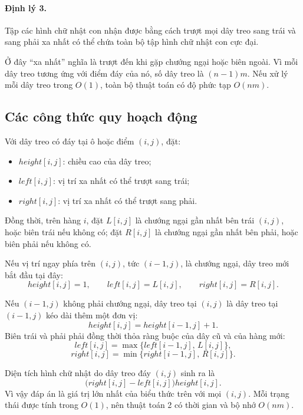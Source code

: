 \documentclass[11pt]{article}
\begin{document}
\paragraph{Định lý 3.}
Tập các hình chữ nhật con nhận được bằng cách trượt mọi dây treo sang trái và
sang phải xa nhất có thể chứa toàn bộ tập hình chữ nhật con cực đại.

Ở đây ``xa nhất'' nghĩa là trượt đến khi gặp chướng ngại hoặc biên ngoài.
Vì mỗi dây treo tương ứng với điểm đáy của nó, số dây treo là
\((n-1)m\). Nếu xử lý mỗi dây treo trong \(O(1)\), toàn bộ thuật toán có độ
phức tạp \(O(nm)\).

\subsection{Các công thức quy hoạch động}

Với dây treo có đáy tại ô hoặc điểm \((i,j)\), đặt:

\begin{itemize}
  \item \(\mathit{height}[i,j]\): chiều cao của dây treo;
  \item \(\mathit{left}[i,j]\): vị trí xa nhất có thể trượt sang trái;
  \item \(\mathit{right}[i,j]\): vị trí xa nhất có thể trượt sang phải.
\end{itemize}

Đồng thời, trên hàng \(i\), đặt \(L[i,j]\) là chướng ngại gần nhất bên trái
\((i,j)\), hoặc biên trái nếu không có; đặt \(R[i,j]\) là chướng ngại gần
nhất bên phải, hoặc biên phải nếu không có.

Nếu vị trí ngay phía trên \((i,j)\), tức \((i-1,j)\), là chướng ngại, dây
treo mới bắt đầu tại đây:
\[
  \mathit{height}[i,j]=1,\qquad
  \mathit{left}[i,j]=L[i,j],\qquad
  \mathit{right}[i,j]=R[i,j].
\]

Nếu \((i-1,j)\) không phải chướng ngại, dây treo tại \((i,j)\) là dây treo
tại \((i-1,j)\) kéo dài thêm một đơn vị:
\[
  \mathit{height}[i,j]=\mathit{height}[i-1,j]+1.
\]
Biên trái và phải phải đồng thời thỏa ràng buộc của dây cũ và của hàng mới:
\[
  \mathit{left}[i,j]=\max\{\mathit{left}[i-1,j],\,L[i,j]\},
\]
\[
  \mathit{right}[i,j]=\min\{\mathit{right}[i-1,j],\,R[i,j]\}.
\]

Diện tích hình chữ nhật do dây treo đáy \((i,j)\) sinh ra là
\[
  \bigl(\mathit{right}[i,j]-\mathit{left}[i,j]\bigr)
  \mathit{height}[i,j].
\]
Vì vậy đáp án là giá trị lớn nhất của biểu thức trên với mọi \((i,j)\). Mỗi
trạng thái được tính trong \(O(1)\), nên thuật toán 2 có thời gian và bộ nhớ
\(O(nm)\).
\end{document}
